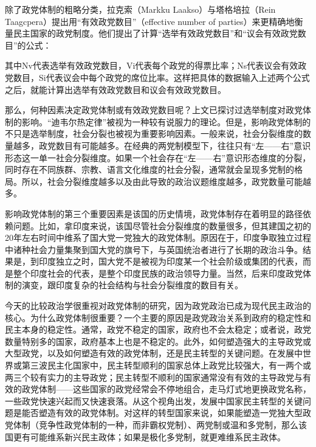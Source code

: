 除了政党体制的粗略分类，拉克索（Markku Laakso）与塔格培拉（Rein Taagcpera）提出用“有效政党数目”（effective number of parties）来更精确地衡量民主国家的政党制度。他们提出了计算“选举有效政党数目”和“议会有效政党数目”的公式：


其中Nv代表选举有效政党数目，Vi代表每个政党的得票比率；Ns代表议会有效政党数目，Si代表议会中每个政党的席位比率。这样把具体的数据输入上述两个公式之后，就能计算出选举有效政党数目和议会有效政党数目。

那么，何种因素决定政党体制或有效政党数目呢？上文已探讨过选举制度对政党体制的影响。“迪韦尔热定律”被视为一种较有说服力的理论。但是，影响政党体制的不只是选举制度，社会分裂也被视为重要影响因素。一般来说，社会分裂维度的数量越多，政党数目有可能越多。在经典的两党制模型下，往往只有“左——右”意识形态这一单一社会分裂维度。如果一个社会存在“左——右”意识形态维度的分裂，同时存在不同族群、宗教、语言文化维度的社会分裂，通常就会呈现多党制的格局。所以，社会分裂维度越多以及由此导致的政治议题维度越多，政党数量可能越多。

影响政党体制的第三个重要因素是该国的历史情境，政党体制存在着明显的路径依赖问题。比如，拿印度来说，该国尽管社会分裂维度的数量很多，但其建国之初的20年左右时间中维系了国大党一党独大的政党体制。原因在于，印度争取独立过程中诸种社会力量集聚到国大党的旗号下，与英国统治者进行了长期的政治斗争。结果是，到印度独立之时，国大党不是被视为印度某一个社会阶级或集团的代表，而是整个印度社会的代表，是整个印度民族的政治领导力量。当然，后来印度政党体制的演变，跟印度复杂的社会结构与社会分裂维度的数目有关。

今天的比较政治学很重视对政党体制的研究，因为政党政治已成为现代民主政治的核心。为什么政党体制很重要？一个主要的原因是政党政治关系到政府的稳定性和民主本身的稳定性。通常，政党不稳定的国家，政府也不会太稳定；或者说，政党数量特别多的国家，政府基本上也是不稳定的。此外，如何塑造强大的主导政党或大型政党，以及如何塑造有效的政党体制，还是民主转型的关键问题。在发展中世界或第三波民主化国家中，民主转型顺利的国家总体上政党比较强大，有一两个或两三个较有实力的主导政党；民主转型不顺利的国家通常没有有效的主导政党与有效的政党体制——这些国家的政党经常会不停地组合，走马灯式地更换政党名称，一些政党快速兴起而又快速衰落。从这个视角出发，发展中国家民主转型的关键问题是能否塑造有效的政党体制。对这样的转型国家来说，如果能塑造一党独大型政党体制（竞争性政党体制的一种，而非霸权党制）、两党制或温和多党制，那么该国更有可能维系新兴民主政体；如果是极化多党制，就更难维系民主政体。

